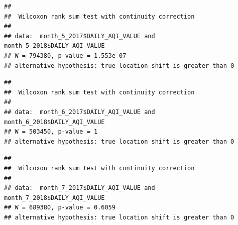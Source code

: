 \documentclass[12pt,]{article}
\newenvironment{Shaded}{\begin{snugshade}}{\end{snugshade}}
\newcommand{\KeywordTok}[1]{\textcolor[rgb]{0.13,0.29,0.53}{\textbf{#1}}}
\newcommand{\DataTypeTok}[1]{\textcolor[rgb]{0.13,0.29,0.53}{#1}}
\newcommand{\DecValTok}[1]{\textcolor[rgb]{0.00,0.00,0.81}{#1}}
\newcommand{\StringTok}[1]{\textcolor[rgb]{0.31,0.60,0.02}{#1}}
\newcommand{\OperatorTok}[1]{\textcolor[rgb]{0.81,0.36,0.00}{\textbf{#1}}}
\newcommand{\NormalTok}[1]{#1}
\begin{document}
\begin{Shaded}
\end{Shaded}

\begin{verbatim}
## 
##  Wilcoxon rank sum test with continuity correction
## 
## data:  month_5_2017$DAILY_AQI_VALUE and month_5_2018$DAILY_AQI_VALUE
## W = 794380, p-value = 1.553e-07
## alternative hypothesis: true location shift is greater than 0
\end{verbatim}

\begin{Shaded}
\end{Shaded}

\begin{verbatim}
## 
##  Wilcoxon rank sum test with continuity correction
## 
## data:  month_6_2017$DAILY_AQI_VALUE and month_6_2018$DAILY_AQI_VALUE
## W = 503450, p-value = 1
## alternative hypothesis: true location shift is greater than 0
\end{verbatim}

\begin{Shaded}
\end{Shaded}

\begin{verbatim}
## 
##  Wilcoxon rank sum test with continuity correction
## 
## data:  month_7_2017$DAILY_AQI_VALUE and month_7_2018$DAILY_AQI_VALUE
## W = 689380, p-value = 0.6059
## alternative hypothesis: true location shift is greater than 0
\end{verbatim}
\end{document}
